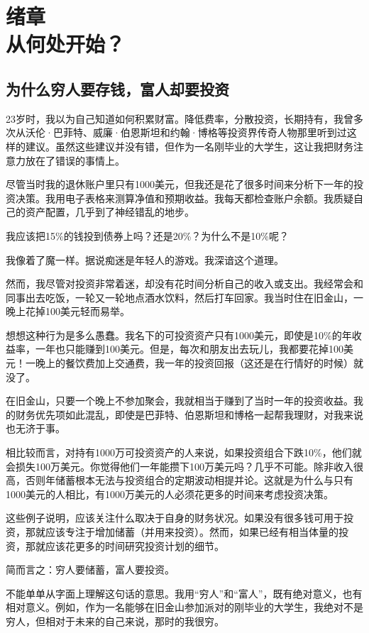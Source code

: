 \section[绪章\q 从何处开始？]{绪章\\ 从何处开始？}

\subsection{为什么穷人要存钱，富人却要投资}
23岁时，我以为自己知道如何积累财富。降低费率，分散投资，长期持有，我曾多次从沃伦·巴菲特、威廉·伯恩斯坦和约翰·博格等投资界传奇人物那里听到过这样的建议。虽然这些建议并没有错，但作为一名刚毕业的大学生，这让我把财务注意力放在了错误的事情上。

尽管当时我的退休账户里只有1000美元，但我还是花了很多时间来分析下一年的投资决策。我用电子表格来测算净值和预期收益。我每天都检查账户余额。我质疑自己的资产配置，几乎到了神经错乱的地步。

我应该把15\%的钱投到债券上吗？还是20\%？为什么不是10\%呢？

我像着了魔一样。据说痴迷是年轻人的游戏。我深谙这个道理。

然而，我尽管对投资非常着迷，却没有花时间分析自己的收入或支出。我经常会和同事出去吃饭，一轮又一轮地点酒水饮料，然后打车回家。我当时住在旧金山，一晚上花掉100美元轻而易举。

想想这种行为是多么愚蠢。我名下的可投资资产只有1000美元，即使是10\%的年收益率，一年也只能赚到100美元。但是，每次和朋友出去玩儿，我都要花掉100美元！一晚上的餐饮费加上交通费，我一年的投资回报（这还是在行情好的时候）就没了。

在旧金山，只要一个晚上不参加聚会，我就相当于赚到了当时一年的投资收益。我的财务优先项如此混乱，即使是巴菲特、伯恩斯坦和博格一起帮我理财，对我来说也无济于事。

相比较而言，对持有1000万可投资资产的人来说，如果投资组合下跌10\%，他们就会损失100万美元。你觉得他们一年能攒下100万美元吗？几乎不可能。除非收入很高，否则年储蓄根本无法与投资组合的定期波动相提并论。这就是为什么与只有1000美元的人相比，有1000万美元的人必须花更多的时间来考虑投资决策。

这些例子说明，应该关注什么取决于自身的财务状况。如果没有很多钱可用于投资，那就应该专注于增加储蓄（并用来投资）。然而，如果已经有相当体量的投资，那就应该花更多的时间研究投资计划的细节。

简而言之：穷人要储蓄，富人要投资。

不能单单从字面上理解这句话的意思。我用“穷人”和“富人”，既有绝对意义，也有相对意义。例如，作为一名能够在旧金山参加派对的刚毕业的大学生，我绝对不是穷人，但相对于未来的自己来说，那时的我很穷。

